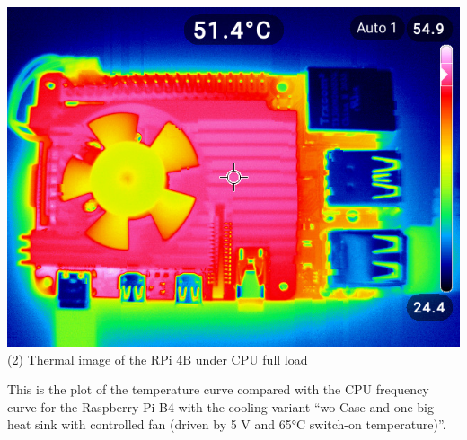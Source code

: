 \documentclass [oneside,10pt,a4paper,ngerman,BCOR10mm,headsepline,parindent,final]{scrartcl}
\begin{document}
\includegraphics{images/thermal_images/RPi4_thermalImage_heavyLoadMode_wHeatSinkAndCtrlFan5V.jpg}\\
(2) Thermal image of the RPi 4B under CPU full load

This is the plot of the temperature curve compared with the CPU
frequency curve for the Raspberry Pi B4 with the cooling variant ``wo
Case and one big heat sink with controlled fan (driven by 5 V and 65°C
switch-on temperature)''.
\end{document}
